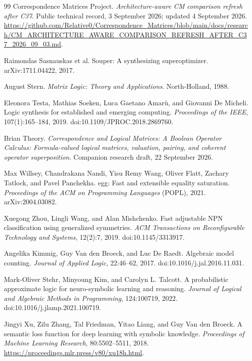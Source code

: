 \documentclass[10pt]{article}
\theoremstyle{plain}
\theoremstyle{definition}
\theoremstyle{remark}
\begin{document}
\begin{thebibliography}{99}
Correspondence Matrices Project.
\newblock \emph{Architecture-aware CM comparison refresh after C37}.
\newblock Public technical record, 3 September 2026; updated 4 September 2026.
\newblock \url{https://github.com/Relative0/Correspondence_Matrices/blob/main/docs/research/CM_ARCHITECTURE_AWARE_COMPARISON_REFRESH_AFTER_C37_2026_09_03.md}.

Raimondas Sasnauskas et al.
\newblock Souper: A synthesizing superoptimizer.
\newblock arXiv:1711.04422, 2017.

August Stern.
\newblock \emph{Matrix Logic: Theory and Applications}.
\newblock North-Holland, 1988.

Eleonora Testa, Mathias Soeken, Luca Gaetano Amar\`u, and Giovanni De Micheli.
\newblock Logic synthesis for established and emerging computing.
\newblock \emph{Proceedings of the IEEE}, 107(1):165--184, 2019.
\newblock doi:10.1109/JPROC.2018.2869760.

Brian Theory.
\newblock \emph{Correspondence and Logical Matrices: A Boolean Operator Calculus: Formula-valued logical matrices, valuation, pairing, and coherent operator superposition}.
\newblock Companion research draft, 22 September 2026.

Max Willsey, Chandrakana Nandi, Yisu Remy Wang, Oliver Flatt, Zachary Tatlock, and Pavel Panchekha.
\newblock egg: Fast and extensible equality saturation.
\newblock \emph{Proceedings of the ACM on Programming Languages} (POPL), 2021.
\newblock arXiv:2004.03082.

Xuegong Zhou, Lingli Wang, and Alan Mishchenko.
\newblock Fast adjustable NPN classification using generalized symmetries.
\newblock \emph{ACM Transactions on Reconfigurable Technology and Systems}, 12(2):7, 2019.
\newblock doi:10.1145/3313917.

Angelika Kimmig, Guy Van den Broeck, and Luc De Raedt.
\newblock Algebraic model counting.
\newblock \emph{Journal of Applied Logic}, 22:46--62, 2017.
\newblock doi:10.1016/j.jal.2016.11.031.

Mark-Oliver Stehr, Minyoung Kim, and Carolyn L. Talcott.
\newblock A probabilistic approximate logic for neuro-symbolic learning and reasoning.
\newblock \emph{Journal of Logical and Algebraic Methods in Programming}, 124:100719, 2022.
\newblock doi:10.1016/j.jlamp.2021.100719.

Jingyi Xu, Zilu Zhang, Tal Friedman, Yitao Liang, and Guy Van den Broeck.
\newblock A semantic loss function for deep learning with symbolic knowledge.
\newblock \emph{Proceedings of Machine Learning Research}, 80:5502--5511, 2018.
\newblock \url{https://proceedings.mlr.press/v80/xu18h.html}.

\end{thebibliography}
\end{document}
